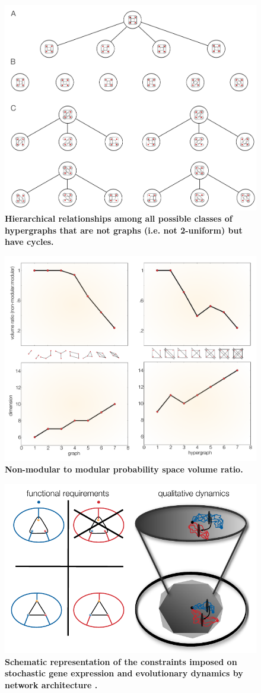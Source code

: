 \begin{figure}[!ht]
\centering
\noindent\includegraphics[width=0.7\columnwidth]{fig/non2uniformcyclichypergraphhasse.pdf}
\caption{{\bf Hierarchical relationships among all possible classes of hypergraphs that are not graphs (i.e. not 2-uniform) but have cycles.}}
\label{fig:non2uniformcyclichypergraphhasse}
\end{figure}

\begin{figure}[!ht]
\centering
\noindent\includegraphics[width=0.9\columnwidth]{fig/figure_graphs_dims_nolines.pdf}
\caption{{\bf Non-modular to modular probability space volume ratio.}}
\label{fig:ncycvolrat}
\end{figure}

\begin{figure}[!ht]
\centering
\noindent\includegraphics[width=0.5\columnwidth]{fig/stochdynscheme.pdf}
\caption{{\bf Schematic representation of the constraints imposed on stochastic gene expression and evolutionary dynamics by network architecture .}}
\label{fig:stochdynscheme}
\end{figure}
